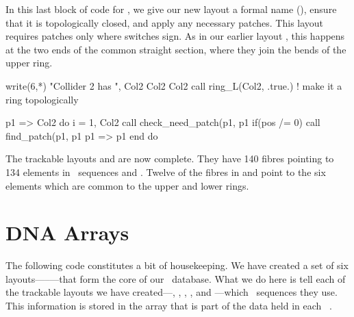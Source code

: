 %
In this last block of code for , we give our new layout a
formal name (), ensure that it is topologically
closed, and apply any necessary patches. This layout requires patches
only where  switches sign. As in our earlier
layout , this happens at the two ends of the common straight
section, where they join the bends of the upper ring.
%
\begin{ptccode}
write(6,*) "Collider 2 has ", Col2%
Col2%
Col2%
call ring_L(Col2, .true.) ! make it a ring topologically

p1 => Col2%
do i = 1, Col2%
  call check_need_patch(p1, p1%
  if(pos /= 0) call find_patch(p1, p1%
  p1 => p1%
end do
\end{ptccode}

The trackable layouts  and  are now complete.
They have 140 fibres pointing to 134 elements in \DNA\ sequences
 and . Twelve of the fibres in  and
 point to the six elements which are common to the upper
and lower rings.


\section{DNA Arrays}
\label{sec:DNA.array}

%
The following code constitutes a bit of housekeeping. We have created a set of six layouts--------that form the core of our \DNA\ database. What we do here is tell each of the trackable layouts we have created---, , , , and ---which \DNA\ sequences they use. This information is stored in the array  that is part of the data held in each \PTC\ .

